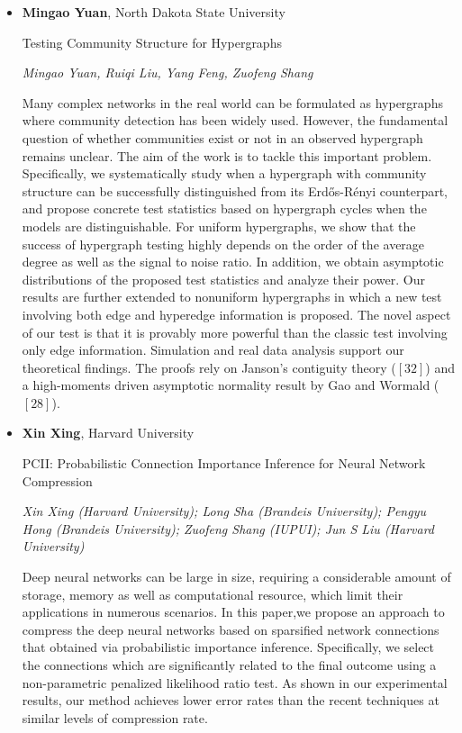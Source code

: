 \begin{itemize}
\item \textbf{Mingao Yuan}, North Dakota State University

Testing Community Structure for Hypergraphs

\emph{\footnotesize Mingao Yuan, Ruiqi Liu, Yang Feng, Zuofeng Shang}

Many complex networks in the real world can be formulated as hypergraphs where community detection has been widely used. However, the fundamental question of whether communities exist or not in an observed hypergraph remains unclear. The aim of the work is to tackle this important problem. Specifically, we systematically study when a hypergraph with community structure can be successfully distinguished from its Erd\H{o}s-R\'enyi counterpart, and propose concrete test statistics based on hypergraph cycles when the models are distinguishable. For uniform hypergraphs, we show that the success of hypergraph testing highly depends on the order of the average degree as well as the signal to noise ratio. In addition, we obtain asymptotic distributions of the proposed test statistics and analyze their power. Our results are further extended to nonuniform hypergraphs in which a new test involving both edge and hyperedge information is proposed. The novel aspect of our test is that it is provably more powerful than the classic test involving only edge information. Simulation and real data analysis support our theoretical findings. The proofs rely on Janson’s contiguity theory ($[32]$) and a high-moments driven asymptotic normality result by Gao and Wormald ($[28]$).

\item \textbf{Xin Xing}, Harvard University

PCII: Probabilistic Connection Importance Inference for Neural Network Compression

\emph{\footnotesize Xin Xing (Harvard University); Long Sha (Brandeis University); Pengyu Hong (Brandeis University); Zuofeng Shang (IUPUI); Jun S Liu (Harvard University)}

Deep neural networks can be large in size, requiring a considerable amount of storage, memory as well as computational resource, which limit their applications in numerous scenarios. In this paper,we propose an approach to compress the deep neural networks based on sparsified network connections that obtained via probabilistic importance inference. Specifically, we select the connections which are significantly related to the final outcome using a non-parametric penalized likelihood ratio test.  As shown in our experimental results, our method achieves lower error rates than the recent techniques at similar levels of compression rate.


\end{itemize}
